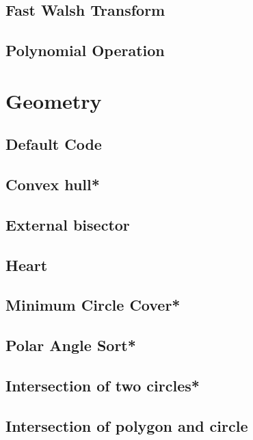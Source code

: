 \subsection{Fast Walsh Transform}

\subsection{Polynomial Operation}



\section{Geometry}
\subsection{Default Code}

\subsection{Convex hull*} %

\subsection{External bisector}

\subsection{Heart}

\subsection{Minimum Circle Cover*} %

\subsection{Polar Angle Sort*} %

\subsection{Intersection of two circles*} %

\subsection{Intersection of polygon and circle}

